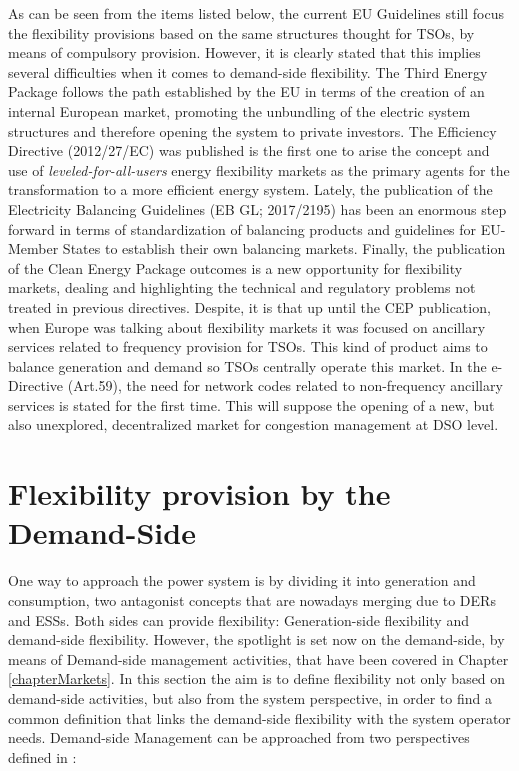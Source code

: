 As can be seen from the items listed below, the current EU Guidelines still focus the flexibility provisions based on the same structures thought for TSOs, by means of compulsory provision. However, it is clearly stated that this implies several difficulties when it comes to demand-side flexibility.
The Third Energy Package follows the path established by the EU in terms of the creation of an internal European market, promoting the unbundling of the electric system structures and therefore opening the system to private investors. The Efficiency Directive (2012/27/EC) was published is the first one to arise the concept and use of \textit{leveled-for-all-users} energy flexibility markets as the primary agents for the transformation to a more efficient energy system. Lately, the publication of the Electricity Balancing Guidelines (EB GL; 2017/2195) has been an enormous step forward in terms of standardization of balancing products and guidelines for EU-Member States to establish their own balancing markets. Finally, the publication of the Clean Energy Package \cite{validzic2017clean} outcomes is a new opportunity for flexibility markets, dealing and highlighting the technical and regulatory problems not treated in previous directives. 
Despite, it is that up until the CEP publication, when Europe was talking about flexibility markets it was focused on ancillary services related to frequency provision for TSOs. This kind of product aims to balance generation and demand so TSOs centrally operate this market. In the e-Directive (Art.59), the need for network codes related to non-frequency ancillary services is stated for the first time. This will suppose the opening of a new, but also unexplored, decentralized market for congestion management at DSO level.


\section{Flexibility provision by the Demand-Side} \label{sec:FlexibilityProvision}

One way to approach the power system is by dividing it into generation and consumption, two antagonist concepts that are nowadays merging due to DERs and ESSs. Both sides can provide flexibility: Generation-side flexibility and demand-side flexibility. However, the spotlight is set now on the demand-side, by means of Demand-side management activities, that have been covered in Chapter \ref{chapterMarkets}. In this section the aim is to define flexibility not only based on demand-side activities, but also from the system perspective, in order to find a common definition that links the demand-side flexibility with the system operator needs. Demand-side Management can be approached from two perspectives defined in \cite{USEF2018}:

